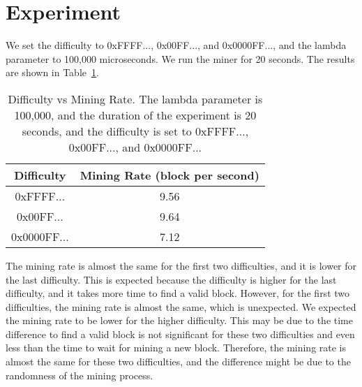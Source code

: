 \documentclass[11pt]{article}
\begin{document}


\section{Experiment}\label{sec:experiment}

We set the difficulty to 0xFFFF..., 0x00FF..., and 0x0000FF..., and the lambda parameter to 100,000 microseconds. We run the miner for 20 seconds. The results are shown in Table~\ref{tab:difficulty_vs_mining_rate}.

\begin{table}[h]
    \centering
    \begin{tabular}{|c|c|}
        \hline
        Difficulty & Mining Rate (block per second) \\
        \hline
        0xFFFF... & 9.56 \\
        0x00FF... & 9.64 \\
        0x0000FF... & 7.12 \\
        \hline
    \end{tabular}
    \caption{Difficulty vs Mining Rate. The lambda parameter is 100,000, and the duration of the experiment is 20 seconds, and the difficulty is set to 0xFFFF..., 0x00FF..., and 0x0000FF...}
    \label{tab:difficulty_vs_mining_rate}

\end{table}

The mining rate is almost the same for the first two difficulties, and it is lower for the last difficulty. This is expected because the difficulty is higher for the last difficulty, and it takes more time to find a valid block. However, for the first two difficulties, the mining rate is almost the same, which is unexpected. We expected the mining rate to be lower for the higher difficulty. This may be due to the time difference to find a valid block is not significant for these two difficulties and even less than the time to wait for mining a new block. Therefore, the mining rate is almost the same for these two difficulties, and the difference might be due to the randomness of the mining process.
\end{document}
